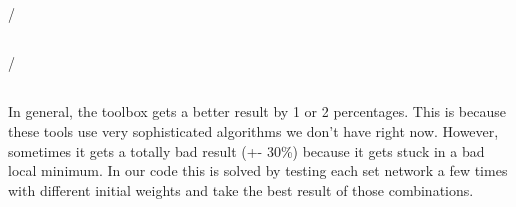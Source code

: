 \documentclass{scrartcl}
\begin{document}
\subsection{}
/

\subsection{}
/

\subsection{}
In general, the toolbox gets a better result by 1 or 2 percentages. This is because these tools use very sophisticated algorithms we don't have right now. However, sometimes it gets a totally bad result (+- 30\%) because it gets stuck in a bad local minimum. In our code this is solved by testing each set network a few times with different initial weights and take the best result of those combinations.






 
  
\end{document}
